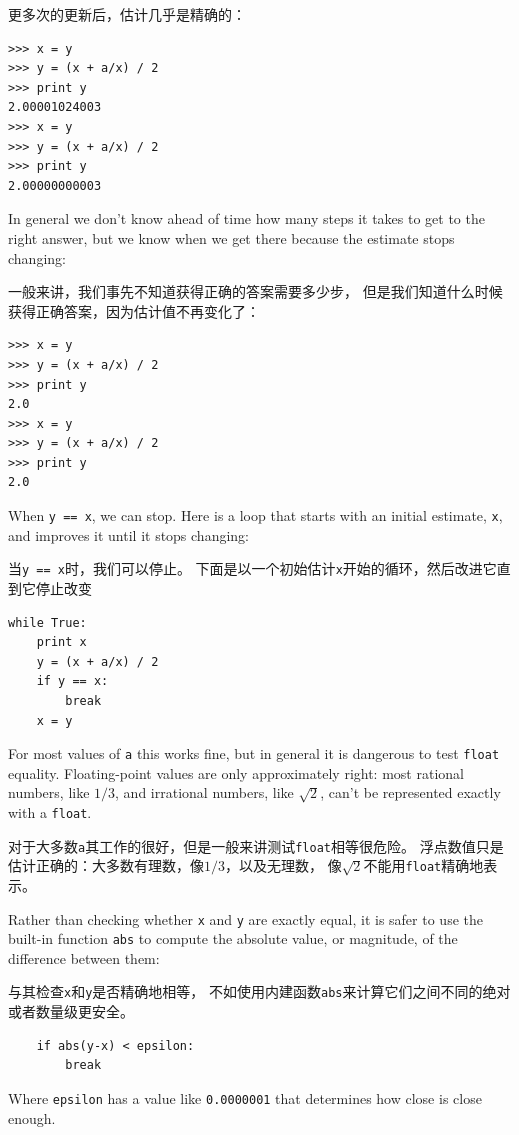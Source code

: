 \documentclass[10pt]{book}
\begin{document}
\begin{CJK}{UTF8}{gbsn}
更多次的更新后，估计几乎是精确的：

\begin{verbatim}
>>> x = y
>>> y = (x + a/x) / 2
>>> print y
2.00001024003
>>> x = y
>>> y = (x + a/x) / 2
>>> print y
2.00000000003
\end{verbatim}
%
In general we don't know ahead of time how many steps it takes
to get to the right answer, but we know when we get there
because the estimate
stops changing:

一般来讲，我们事先不知道获得正确的答案需要多少步，
但是我们知道什么时候获得正确答案，因为估计值不再变化了：

\begin{verbatim}
>>> x = y
>>> y = (x + a/x) / 2
>>> print y
2.0
>>> x = y
>>> y = (x + a/x) / 2
>>> print y
2.0
\end{verbatim}
%
When {\tt y == x}, we can stop.  Here is a loop that starts
with an initial estimate, {\tt x}, and improves it until it
stops changing:

当{\tt y == x}时，我们可以停止。
下面是以一个初始估计{\tt x}开始的循环，然后改进它直到它停止改变

\begin{verbatim}
while True:
    print x
    y = (x + a/x) / 2
    if y == x:
        break
    x = y
\end{verbatim}
%
For most values of {\tt a} this works fine, but in general it is
dangerous to test {\tt float} equality.
Floating-point values are only approximately right:
most rational numbers, like $1/3$, and irrational numbers, like
$\sqrt{2}$, can't be represented exactly with a {\tt float}.

对于大多数{\tt a}其工作的很好，但是一般来讲测试{\tt float}相等很危险。
浮点数值只是估计正确的：大多数有理数，像$1/3$，以及无理数，
像$\sqrt{2}$不能用{\tt float}精确地表示。

Rather than checking whether {\tt x} and {\tt y} are exactly equal, it
is safer to use the built-in function {\tt abs} to compute the
absolute value, or magnitude, of the difference between them:

与其检查{\tt x}和{\tt y}是否精确地相等，
不如使用内建函数{\tt abs}来计算它们之间不同的绝对或者数量级更安全。

\begin{verbatim}
    if abs(y-x) < epsilon:
        break
\end{verbatim}
%
Where \verb"epsilon" has a value like {\tt 0.0000001} that
determines how close is close enough.


\end{CJK}
\end{document}
